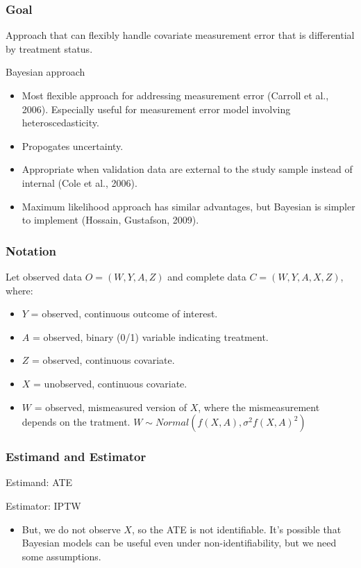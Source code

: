 \documentclass{beamer}
\begin{document}
\begin{frame}

\frametitle{ Goal}


Approach that can flexibly handle covariate measurement error that is differential by treatment status.



Bayesian approach
\begin{itemize}
	\item Most flexible approach for addressing measurement error (Carroll et al., 2006). Especially useful for measurement error model involving heteroscedasticity.
	\item Propogates uncertainty.
	\item Appropriate when validation data are external to the study sample instead of internal (Cole et al., 2006).
	\item Maximum likelihood approach has similar advantages, but Bayesian is simpler to implement (Hossain, Gustafson, 2009).
\end{itemize}

 

\end{frame} 

\begin{frame}

\frametitle{ Notation}


Let observed data $O=(W, Y, A, Z)$ and complete data $C=(W, Y, A, X, Z)$, where:


\begin{itemize}
\item $Y$ = observed, continuous outcome of interest. 

\item $A$ = observed, binary (0/1) variable indicating treatment. 

\item $Z$ = observed, continuous covariate. 

\item $X$ = unobserved, continuous covariate. 

\item $W$ = observed, mismeasured version of $X$, where the mismeasurement depends on the tratment. $W \sim Normal(f(X,A), \sigma^2f(X,A)^2)$

\end{itemize}


\end{frame} 

\begin{frame}

\frametitle{ Estimand and Estimator}


Estimand: ATE 

Estimator: IPTW
\begin{itemize}
\item But, we do not observe $X$, so the ATE is not identifiable. It's possible that Bayesian models can be useful even under non-identifiability, but we need some assumptions.
\end{itemize}
\end{frame} 
\end{document}
